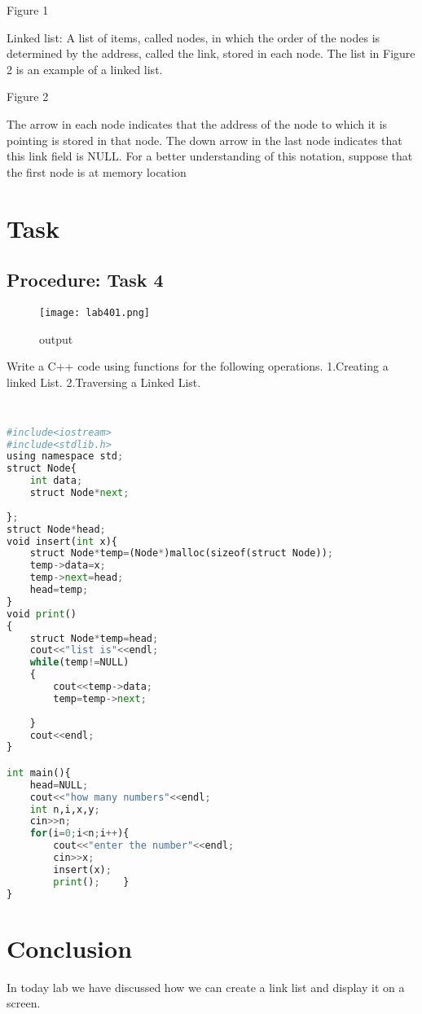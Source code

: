 \documentclass[11pt]{article}            %
\begin{document}
Figure 1

Linked list: A list of items, called nodes, in which the order of the nodes is determined by
the address, called the link, stored in each node.
The list in Figure 2 is an example of a linked
list.

Figure 2

The arrow in each node indicates that the address of the node to which it is pointing is stored
in that node. The down arrow in the last node indicates that this link field is NULL.
For a better understanding of this notation, suppose that the first node is at memory
location
\section{Task}  
\subsection{Procedure: Task 4 }     

\begin{figure*}
\centering
  \texttt{[image: lab401.png]}
\caption{output}
\label{Figure:Untitled}    
\end{figure*}
Write a C++ code using functions for the following operations.
1.Creating a linked List.
2.Traversing a Linked List.

\subsection{ }     

\begin{lstlisting}[language=Python]
 
#include<iostream>
#include<stdlib.h>
using namespace std;
struct Node{
	int data;
	struct Node*next;
	
};
struct Node*head;
void insert(int x){
	struct Node*temp=(Node*)malloc(sizeof(struct Node));
	temp->data=x;
	temp->next=head;
	head=temp;
}
void print()
{
	struct Node*temp=head;
	cout<<"list is"<<endl;
	while(temp!=NULL)
	{
		cout<<temp->data;
		temp=temp->next;
		
	}
	cout<<endl;
}

int main(){
	head=NULL;
	cout<<"how many numbers"<<endl;
	int n,i,x,y;
	cin>>n;
	for(i=0;i<n;i++){
		cout<<"enter the number"<<endl;
		cin>>x;
		insert(x);
		print();	}	
}
\end{lstlisting}

\section{Conclusion}  
In today lab we have discussed how we can create a link list and display it on a screen.

 
\end{document}
